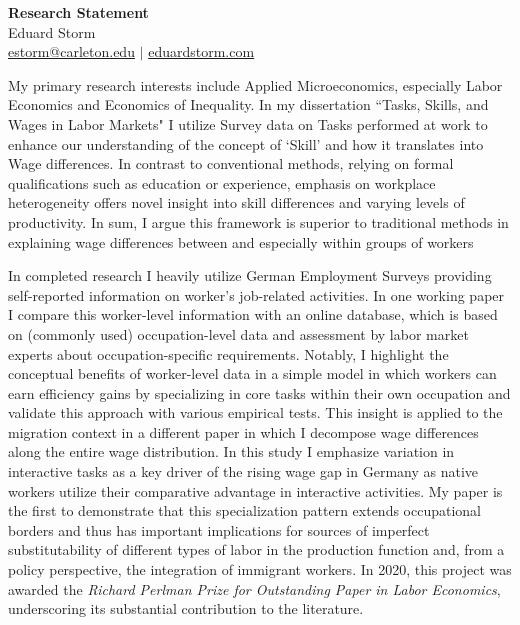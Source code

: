 \documentclass[a4paper,11pt]{article}
\begin{document}
\thispagestyle{plain}

\begin{center}
 {\Large \textbf{Research Statement}} \\
 Eduard Storm \\
 \href{mailto:estorm@carleton.edu}{estorm@carleton.edu} $|$ \href{https://eduardstorm.com/}{eduardstorm.com}
\end{center}

\noindent

My primary research interests include Applied Microeconomics, especially Labor Economics and Economics of Inequality. In my dissertation ``Tasks, Skills, and Wages in Labor Markets" I utilize Survey data on Tasks performed at work to enhance our understanding of the concept of `Skill' and how it translates into Wage differences. In contrast to conventional methods, relying on formal qualifications such as education or experience, emphasis on workplace heterogeneity offers novel insight into skill differences and varying levels of productivity. In sum, I argue this framework is superior to traditional methods in explaining wage differences between and especially within groups of workers


In completed research I heavily utilize German Employment Surveys providing self-reported information on worker's job-related activities. In one working paper I compare this worker-level information with an online database, which is based on (commonly used) occupation-level data and assessment by labor market experts about occupation-specific requirements. Notably, I highlight the conceptual benefits of worker-level data in a simple model in which workers can earn efficiency gains by specializing in core tasks within their own occupation and validate this approach with various empirical tests. This insight is applied to the migration context in a different paper in which I decompose wage differences along the entire wage distribution. In this study I emphasize variation in interactive tasks as a key driver of the rising wage gap in Germany as native workers utilize their comparative advantage in interactive activities. My paper is the first to demonstrate that this specialization pattern extends occupational borders and thus has important implications for sources of imperfect substitutability of different types of labor in the production function and, from a policy perspective, the integration of immigrant workers. In 2020, this project was awarded the \textit{Richard Perlman Prize for Outstanding Paper in Labor Economics}, underscoring its substantial contribution to the literature.
\end{document}
